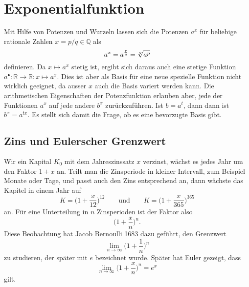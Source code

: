 %
%
%
\section{Exponentialfunktion 
\label{buch:exponential:section:grenzwert}}
Mit Hilfe von Potenzen und Wurzeln lassen sich die Potenzen $a^x$
für beliebige rationale Zahlen $x=p/q\in\mathbb{Q}$ als
\[
a^x = a^{\frac{p}{q}} = \root{q}\of{a^p}
\]
definieren.
Da $x\mapsto a^x$ stetig ist, ergibt sich daraus auch eine
stetige Funktion
$a^{\bullet}\colon \mathbb{R}\to\mathbb{R}:x\mapsto a^x$.
Dies ist aber als Basis für eine neue spezielle Funktion nicht
wirklich geeignet, da ausser $x$ auch die Basis variert werden kann.
Die arithmetischen Eigenschaften der Potenzfunktion erlauben aber,
jede der Funktionen $a^x$ auf jede andere $b^x$ zurückzuführen.
Ist $b=a^t$, dann dann ist $b^x = a^{tx}$.
Es stellt sich damit die Frage, ob es eine bevorzugte Basis gibt.

%
%
\subsection{Zins und Eulerscher Grenzwert}
Wir ein Kapital $K_0$ mit dem Jahreszinssatz $x$ verzinst,
wächst es jedes Jahr um den Faktor $1+x$ an.
Teilt man die Zinsperiode in kleiner Intervall, zum Beispiel Monate
oder Tage, und passt auch den Zins entsprechend an, dann wächste
das Kapitel in einem Jahr auf
\[
K = \biggl(1+\frac{x}{12}\biggr)^{12}
\qquad\text{und}\qquad
K = \biggl(1+\frac{x}{365}\biggr)^{365}
\]
an.
Für eine Unterteilung in $n$ Zinsperioden ist der Faktor also
\[
\biggl(1+\frac{x}{n}\biggr)^n.
\]
Diese Beobachtung hat Jacob Bernoulli 1683 dazu geführt, den Grenzwert
\[
\lim_{n\to\infty} \biggl(1+\frac1n\biggr)^n
\]
zu studieren, der später mit $e$ bezeichnet wurde.
Später hat Euler gezeigt, dass 
\begin{equation}
\lim_{n\to\infty}\biggl(1+\frac{x}{n}\biggr)^n
=
e^x
\label{buch:exponential:zins:eulerex}
\end{equation}
gilt.

